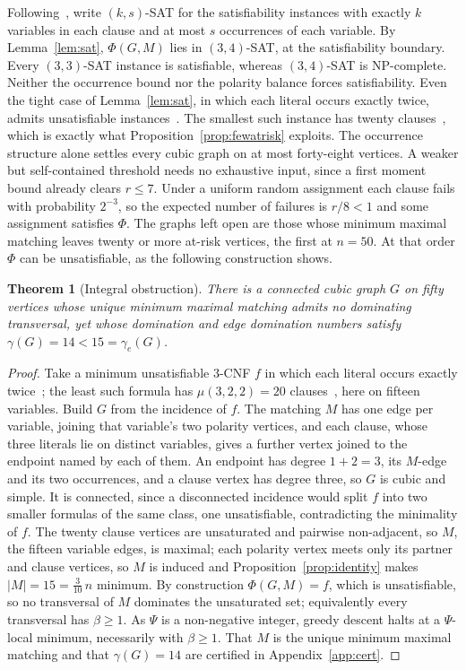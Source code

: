 \documentclass[11pt]{article}
\newtheorem{theorem}{Theorem}
\theoremstyle{definition}
\theoremstyle{remark}
\newcommand{\edom}{\gamma_{e}}
\newcommand{\Pot}{\Psi}
\begin{document}
\noindent
Following~\cite{Tovey1984}, write $(k,s)$-SAT for the satisfiability
instances with exactly $k$ variables in each clause and at most $s$ occurrences
of each variable. By Lemma~\ref{lem:sat}, $\Phi(G,M)$ lies in $(3,4)$-SAT, at the
satisfiability boundary. Every $(3,3)$-SAT instance is satisfiable, whereas
$(3,4)$-SAT is NP-complete. Neither the occurrence bound nor the polarity balance
forces satisfiability. Even the tight case of Lemma~\ref{lem:sat}, in which each
literal occurs exactly twice, admits unsatisfiable instances~\cite{Berman2003}.
The smallest such instance has twenty clauses~\cite{ZhangPeitlSzeider2024}, which
is exactly what Proposition~\ref{prop:fewatrisk} exploits. The occurrence
structure alone settles every cubic graph on at most forty-eight vertices. A
weaker but self-contained threshold needs no exhaustive input, since a first
moment bound already clears $r \le 7$. Under a uniform random assignment each
clause fails with probability $2^{-3}$, so the expected number of failures is
$r/8 < 1$ and some assignment satisfies $\Phi$. The graphs left open are those
whose minimum maximal matching leaves twenty or more at-risk vertices, the first
at $n = 50$. At that order $\Phi$ can be unsatisfiable, as the following
construction shows.

\begin{theorem}[Integral obstruction]\label{thm:cex}
There is a connected cubic graph $G$ on fifty vertices whose unique minimum
maximal matching admits no dominating transversal, yet whose domination and edge
domination numbers satisfy $\gamma(G) = 14 < 15 = \edom(G)$.
\end{theorem}

\begin{proof}
Take a minimum unsatisfiable $3$-CNF $f$ in which each literal occurs exactly
twice~\cite{Berman2003}; the least such formula has $\mu(3,2,2) = 20$
clauses~\cite{ZhangPeitlSzeider2024}, here on fifteen variables. Build $G$ from the incidence of $f$. The matching $M$ has one edge per variable, joining that variable's two polarity
vertices, and each clause, whose three literals lie on distinct variables, gives
a further vertex joined to the endpoint named by each of them. An endpoint has
degree $1 + 2 = 3$, its $M$-edge
and its two occurrences, and a clause vertex has degree three, so $G$ is cubic
and simple. It is connected, since a disconnected incidence would split $f$ into two
smaller formulas of the same class, one unsatisfiable, contradicting the
minimality of $f$. The twenty clause vertices are unsaturated and pairwise
non-adjacent, so $M$, the fifteen variable edges, is maximal; each polarity vertex
meets only its partner and clause vertices, so $M$ is induced and
Proposition~\ref{prop:identity} makes $|M| = 15 = \tfrac{3}{10}\,n$ minimum. By construction $\Phi(G,M) = f$, which is
unsatisfiable, so no transversal of $M$ dominates the unsaturated set; equivalently
every transversal has $\beta \ge 1$. As $\Pot$ is a non-negative integer, greedy
descent halts at a $\Pot$-local minimum, necessarily with $\beta \ge 1$. That $M$
is the unique minimum maximal matching and that $\gamma(G) = 14$ are certified in
Appendix~\ref{app:cert}.
\end{proof}
\end{document}
